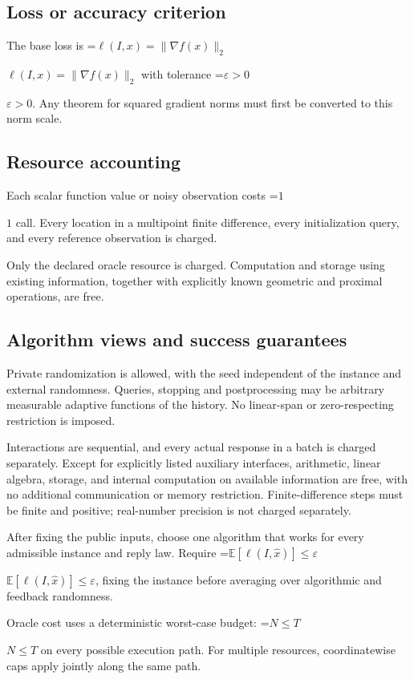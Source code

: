 \documentclass[10pt,a4paper]{article}
\newcommand{\AtlasMath}[1]{\par\begingroup\centering\setbox0=\hbox{$\displaystyle #1$}\ifdim\wd0>1.4\linewidth\typeout{ATLAS WIDE FORMULA: \the\wd0}\fi\ifdim\wd0>\linewidth\resizebox{\linewidth}{!}{\box0}\else\box0\fi\par\endgroup}
\newcommand{\AtlasInlineMath}[1]{\begingroup\setbox0=\hbox{$#1$}\ifdim\wd0>.4\linewidth\endgroup\AtlasMath{#1}\else\endgroup$#1$\fi}
\begin{document}
\subsection{Loss or accuracy criterion}
The base loss is \AtlasInlineMath{\ell(I,x)=\|\nabla f(x)\|_2} with tolerance \AtlasInlineMath{\varepsilon>0}. Any theorem for squared gradient norms must first be converted to this norm scale.

\subsection{Resource accounting}
Each scalar function value or noisy observation costs \AtlasInlineMath{1} call. Every location in a multipoint finite difference, every initialization query, and every reference observation is charged.

Only the declared oracle resource is charged. Computation and storage using existing information, together with explicitly known geometric and proximal operations, are free.

\subsection{Algorithm views and success guarantees}
Private randomization is allowed, with the seed independent of the instance and external randomness. Queries, stopping and postprocessing may be arbitrary measurable adaptive functions of the history. No linear-span or zero-respecting restriction is imposed.

Interactions are sequential, and every actual response in a batch is charged separately. Except for explicitly listed auxiliary interfaces, arithmetic, linear algebra, storage, and internal computation on available information are free, with no additional communication or memory restriction. Finite-difference steps must be finite and positive; real-number precision is not charged separately.

After fixing the public inputs, choose one algorithm that works for every admissible instance and reply law. Require \AtlasInlineMath{\mathbb{E}[\ell(I,\widehat{x})]\le \varepsilon}, fixing the instance before averaging over algorithmic and feedback randomness.

Oracle cost uses a deterministic worst-case budget: \AtlasInlineMath{N\le T} on every possible execution path. For multiple resources, coordinatewise caps apply jointly along the same path.
\end{document}
